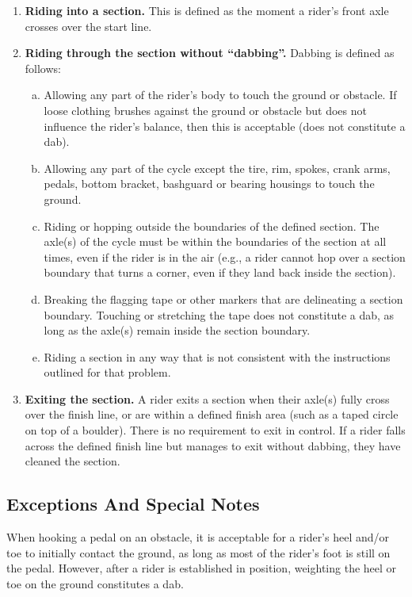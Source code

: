 \begin{enumerate}
\item \textbf{Riding into a section.} This is defined as the moment a rider's front axle crosses over the start line.
\item \textbf{Riding through the section without ``dabbing''.} Dabbing is defined as follows:
	\begin{enumerate}[a.]
	\item Allowing any part of the rider's body to touch the ground or obstacle. 
	If loose clothing brushes against the ground or obstacle but does not influence the rider's balance, then this is acceptable (does not constitute a dab).
	\item Allowing any part of the cycle except the tire, rim, spokes, crank arms, pedals, bottom bracket, bashguard or bearing housings to touch the ground.
	\item Riding or hopping outside the boundaries of the defined section.
	The axle(s) of the cycle must be within the boundaries of the section at all times, even if the rider is in the air (e.g., a rider cannot hop over a section boundary that turns a corner, even if they land back inside the section).
	\item Breaking the flagging tape or other markers that are delineating a section boundary. 
	Touching or stretching the tape does not constitute a dab, as long as the axle(s) remain inside the section boundary.
	\item Riding a section in any way that is not consistent with the instructions outlined for that problem.
	\end{enumerate}
\item \textbf{Exiting the section.} A rider exits a section when their axle(s) fully cross over the finish line, or are within a
defined finish area (such as a taped circle on top of a boulder). 
There is no requirement to exit in control.
If a rider falls across the defined finish line but manages to exit without dabbing, they have cleaned the section.
\end{enumerate}

\subsection{Exceptions And Special Notes}
When hooking a pedal on an obstacle, it is acceptable for a rider's heel and/or toe to initially contact the ground, as long
as most of the rider's foot is still on the pedal. 
However, after a rider is established in position, weighting the heel or toe on the ground constitutes a dab.

